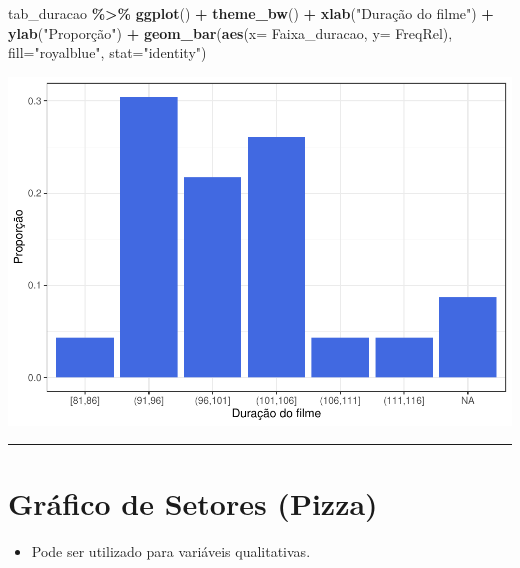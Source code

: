 \documentclass[
]{book}
\newenvironment{Shaded}{\begin{snugshade}}{\end{snugshade}}
\newcommand{\AttributeTok}[1]{\textcolor[rgb]{0.13,0.29,0.53}{#1}}
\newcommand{\FunctionTok}[1]{\textcolor[rgb]{0.13,0.29,0.53}{\textbf{#1}}}
\newcommand{\NormalTok}[1]{#1}
\newcommand{\SpecialCharTok}[1]{\textcolor[rgb]{0.81,0.36,0.00}{\textbf{#1}}}
\newcommand{\StringTok}[1]{\textcolor[rgb]{0.31,0.60,0.02}{#1}}
\providecommand{\tightlist}{%
  \setlength{\itemsep}{0pt}\setlength{\parskip}{0pt}}
\begin{document}
\begin{Shaded}
\begin{Highlighting}[]
\NormalTok{tab\_duracao }\SpecialCharTok{\%\textgreater{}\%} 
  \FunctionTok{ggplot}\NormalTok{() }\SpecialCharTok{+} \FunctionTok{theme\_bw}\NormalTok{() }\SpecialCharTok{+} \FunctionTok{xlab}\NormalTok{(}\StringTok{"Duração do filme"}\NormalTok{) }\SpecialCharTok{+} \FunctionTok{ylab}\NormalTok{(}\StringTok{"Proporção"}\NormalTok{) }\SpecialCharTok{+}
  \FunctionTok{geom\_bar}\NormalTok{(}\FunctionTok{aes}\NormalTok{(}\AttributeTok{x=}\NormalTok{ Faixa\_duracao, }\AttributeTok{y=}\NormalTok{ FreqRel), }\AttributeTok{fill=}\StringTok{"royalblue"}\NormalTok{, }\AttributeTok{stat=}\StringTok{"identity"}\NormalTok{)}
\end{Highlighting}
\end{Shaded}

\begin{center}\includegraphics{AED_files/figure-latex/graf_duracao-1} \end{center}

\begin{center}\rule{0.5\linewidth}{0.5pt}\end{center}

\section{Gráfico de Setores (Pizza)}\label{gruxe1fico-de-setores-pizza}

\begin{itemize}
\tightlist
\item
  Pode ser utilizado para variáveis qualitativas.
\end{itemize}
\end{document}
